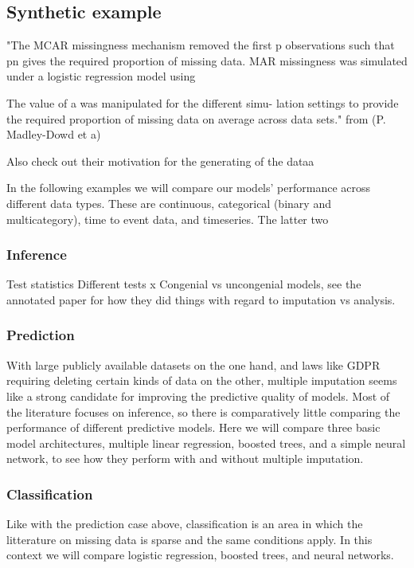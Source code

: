 \documentclass{article}
\begin{document}
	\subsection{Synthetic example}
	
	
	"The MCAR missingness mechanism
	removed the first p observations such that pn gives the
	required proportion of missing data. MAR missingness
	was simulated under a logistic regression model using
	
	The value of a was manipulated for the different simu-
	lation settings to provide the required proportion of missing
	data on average across data sets." from (P. Madley-Dowd et a)
	
	Also check out their motivation for the generating of the dataa
	
	
	In the following examples we will compare our models' performance across different data types. These are continuous, categorical (binary and multicategory), time to event data, and timeseries. The latter two 
	
	\subsubsection{Inference}
	Test statistics
	Different tests
	x
	Congenial vs uncongenial models, see the annotated paper for how they did things with regard to imputation vs analysis. 
	
	\subsubsection{Prediction}
	With large publicly available datasets on the one hand, and laws like GDPR requiring deleting certain kinds of data on the other, multiple imputation seems like a strong candidate for improving the predictive quality of models. Most of the literature focuses on inference, so there is comparatively little comparing the performance of different predictive models. Here we will compare three basic model architectures, multiple linear regression, boosted trees, and a simple neural network, to see how they perform with and without multiple imputation.
	
	
	
	
	\subsubsection{Classification}
	Like with the prediction case above, classification is an area in which the litterature on missing data is sparse and the same conditions apply. In this context we will compare logistic regression, boosted trees, and neural networks.
	
\end{document}
